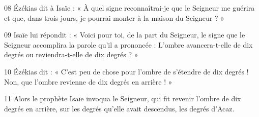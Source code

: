 
08 Ézékias dit à Isaïe : « À quel signe reconnaîtrai-je que le Seigneur me guérira et que, dans trois jours, je pourrai monter à la maison du Seigneur ? »

09 Isaïe lui répondit : « Voici pour toi, de la part du Seigneur, le signe que le Seigneur accomplira la parole qu’il a prononcée : L’ombre avancera-t-elle de dix degrés ou reviendra-t-elle de dix degrés ? »

10 Ézékias dit : « C’est peu de chose pour l’ombre de s’étendre de dix degrés ! Non, que l’ombre revienne de dix degrés en arrière ! »

11 Alors le prophète Isaïe invoqua le Seigneur, qui fit revenir l’ombre de dix degrés en arrière, sur les degrés qu’elle avait descendus, les degrés d’Acaz.